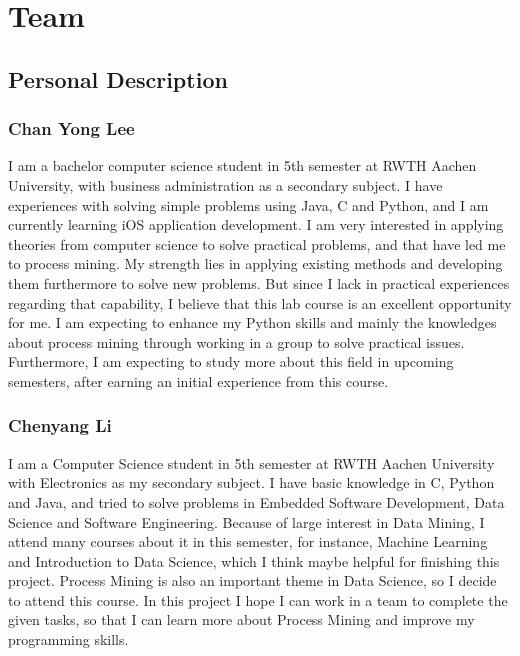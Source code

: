 \documentclass{article}
\begin{document}
\section{Team}

\subsection{Personal Description}


\subsubsection{Chan Yong Lee}
I am a bachelor computer science student in 5th semester at RWTH Aachen University, with business administration as a secondary subject. I have experiences with solving simple problems using Java, C and Python, and I am currently learning iOS application development. I am very interested in applying theories from computer science to solve practical problems, and that have led me to process mining. My strength lies in applying existing methods and developing them furthermore to solve new problems. But since I lack in practical experiences regarding that capability, I believe that this lab course is an excellent opportunity for me. I am expecting to enhance my Python skills and mainly the knowledges about process mining through working in a group to solve practical issues. Furthermore, I am expecting to study more about this field in upcoming semesters, after earning an initial experience from this course.

\subsubsection{Chenyang Li}
I am a Computer Science student in 5th semester at RWTH Aachen University with Electronics as my secondary subject. I have basic knowledge in C, Python and Java, and tried to solve problems in Embedded Software Development, Data Science and Software Engineering. Because of large interest in Data Mining, I attend many courses about it in this semester, for instance, Machine Learning and Introduction to Data Science, which I think maybe helpful for finishing this project. Process Mining is also an important theme in Data Science, so I decide to attend this course. In this project I hope I can work in a team to complete the given tasks, so that I can learn more about Process Mining and improve my programming skills.
\end{document}
